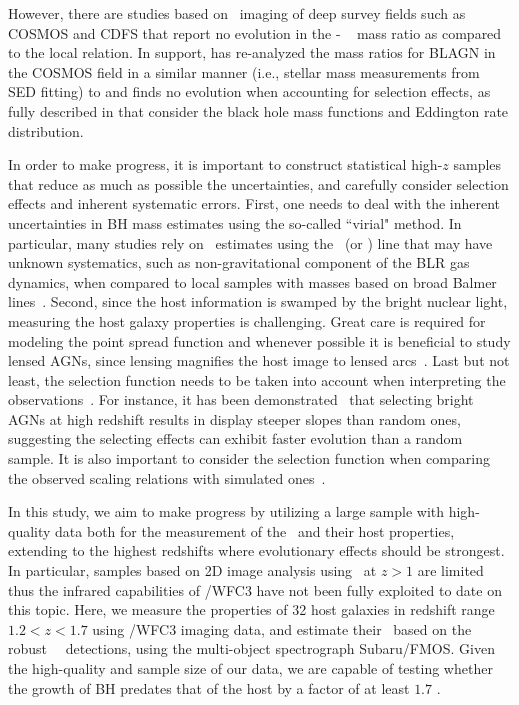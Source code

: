 \documentclass[apj]{emulateapj}
\begin{document}
However, there are studies \citep{Cisternas2011,SS13,Mechtley2016} based on \hst\  imaging of deep survey fields such as COSMOS and CDFS that report no evolution in the \mbh - \smass ~ mass ratio as compared to the local relation. In support, \citet{Sun2015} has re-analyzed the mass ratios for BLAGN in the COSMOS field in a similar manner (i.e., stellar mass measurements from SED fitting) to \citet{Merloni2010} and finds no evolution when accounting for selection effects, as fully described in \citet{Schulze2014} that consider the black hole mass functions and Eddington rate distribution. 

In order to make progress, it is important to construct statistical high-$z$ samples that reduce as much as possible the uncertainties, and carefully consider selection effects and inherent systematic errors. First, one needs to deal with the inherent uncertainties in BH mass estimates using the so-called ``virial" method. In particular, many studies rely on \mbh\ estimates using the \Civ\ (or \Mgii) line that may have unknown systematics, such as non-gravitational component of the BLR gas dynamics, when compared to local samples with masses based on broad Balmer lines~\citep[i.e. \halpha\ and \hbeta,][]{Schulze2018, Baskin2005, Trakhtenbrot2012}. Second, since the host information is swamped by the bright nuclear light, measuring the host galaxy properties is challenging. Great care is required for modeling the point spread function and whenever possible it is beneficial to study lensed AGNs, since lensing magnifies the host image to lensed arcs~\citep{Pen++06qsob, Ding2017a, Ding2017b}. Last but not least, the selection function needs to be taken into account when interpreting the observations~\citep{Treu2007, Lauer2007}. For instance, it has been demonstrated~\citep{Schulze2011, Schulze2014} that selecting bright AGNs at high redshift results in display steeper slopes than random ones, suggesting the selecting effects can exhibit faster evolution than a random sample. It is also important to consider the selection function when comparing the observed scaling relations with simulated ones~\citep{DeG++15}.

 
In this study, we aim to make progress by utilizing a large sample with high-quality data both for the measurement of the \mbh\ and their host properties, extending to the highest redshifts where evolutionary effects should be strongest. In particular, samples based on 2D image analysis using \hst\ at $z>1$ are limited thus the infrared capabilities of \hst/WFC3 have not been fully exploited to date on this topic. Here, we measure the properties of 32 host galaxies in redshift range $1.2<z<1.7$ using \hst/WFC3 imaging data, and estimate their \mbh\ based on the robust \halpha\ ~detections, using the multi-object spectrograph Subaru/FMOS. Given the high-quality and sample size of our data, we are capable of testing whether the growth of BH predates that of the host by a factor of at least $1.7$ \citep[i.e. $\sim0.23$ dex,][]{Schulze2014}.
\end{document}
